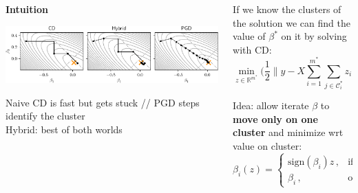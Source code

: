 \documentclass[english,final,t]{beamer}
\newcommand{\bbR}{\mathbb{R}}
\DeclareMathOperator{\sign}{sign}
\begin{document}
\begin{frame}{}
\begin{columns}[t]
\begin{column}{.3\linewidth}
	\begin{block}{\textbf{\color{malgared} Intuition}}

		\begin{center}
			\includegraphics[width=0.8\linewidth]{images/illustration_solvers}

			Naive CD is fast but gets stuck // PGD steps identify the cluster \\[5mm]

			Hybrid: best of both worlds
		\end{center}

	\end{block}
\end{column}
\begin{column}{.3\linewidth}
	\begin{block}{\textbf{\color{malgared}{\#1 Clusterwise minimization}}}
		If we know the clusters of the solution we can find the value of $\beta^*$ on it by solving with CD:
		\begin{equation*}
			\min_{z \in \bbR^{m^*}}\bigg(
				\frac{1}{2} \Big\lVert y - X \sum_{i=1}^{m^*} \sum_{j \in \mathcal{C}_i^*} z_i \sign(\beta_j^*) e_j \Big\rVert^2
				+ \sum_{i=1}^{m^*} | z_i | \sum_{j \in \mathcal{C}_i^*} \lambda_j
				\bigg).
		\end{equation*}

		Idea: allow iterate $\beta$ to \textbf{move only on one cluster} and minimize wrt value on cluster:
		\begin{equation*}
			\beta_i(z) =
			\begin{cases}
			  \mathrm{sign}(\beta_i) z   \, , & \text{if } i \in \mathcal{C}_k \, , \\
			  \beta_i \, ,                    & \text{otherwise} \, .
			\end{cases}
		\end{equation*}


\end{block}
\end{column}
\end{columns}
\end{frame}
\end{document}
